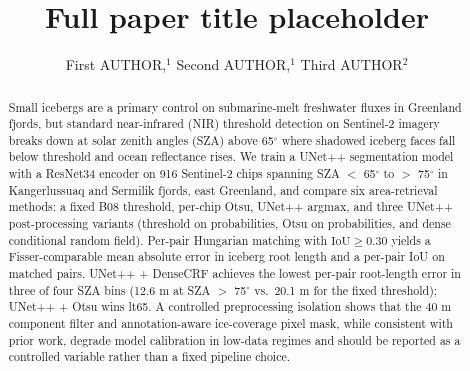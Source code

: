 \documentclass[review,jog]{igs}
\begin{document}
\title[Short running-head title]{Full paper title placeholder}

\author[First and others]{First AUTHOR,$^1$
  Second AUTHOR,$^1$
  Third AUTHOR$^2$}


\begin{frontmatter}

\maketitle

\begin{abstract}
Small icebergs are a primary control on submarine-melt freshwater fluxes in Greenland fjords, but standard near-infrared (NIR) threshold detection on Sentinel-2 imagery breaks down at solar zenith angles (SZA) above 65$^\circ$ where shadowed iceberg faces fall below threshold and ocean reflectance rises. We train a UNet++ segmentation model with a ResNet34 encoder on 916 Sentinel-2 chips spanning SZA $<$ 65$^\circ$ to $>$ 75$^\circ$ in Kangerlussuaq and Sermilik fjords, east Greenland, and compare six area-retrieval methods: a fixed B08 threshold, per-chip Otsu, UNet++ argmax, and three UNet++ post-processing variants (threshold on probabilities, Otsu on probabilities, and dense conditional random field). Per-pair Hungarian matching with $\mathrm{IoU} \geq 0.30$ yields a Fisser-comparable mean absolute error in iceberg root length and a per-pair IoU on matched pairs. UNet++ + DenseCRF achieves the lowest per-pair root-length error in three of four SZA bins (12.6 m at SZA $>$ 75$^\circ$ vs.\ 20.1 m for the fixed threshold); UNet++ + Otsu wins lt65. A controlled preprocessing isolation shows that the 40 m component filter and annotation-aware ice-coverage pixel mask, while consistent with prior work, degrade model calibration in low-data regimes and should be reported as a controlled variable rather than a fixed pipeline choice.
\end{abstract}

\end{frontmatter}
\end{document}
